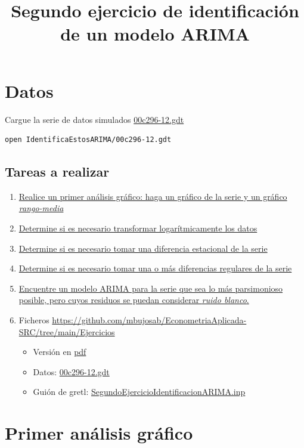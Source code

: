 \documentclass[10pt]{article}
\date{}
\title{Segundo ejercicio de identificación de un modelo ARIMA}
\begin{document}
\maketitle
\section*{Datos}
\label{sec:org64b2946}

Cargue la serie de datos simulados \href{IdentificaEstosARIMA/00c296-12.gdt}{00c296-12.gdt}

\begin{verbatim}
open IdentificaEstosARIMA/00c296-12.gdt
\end{verbatim}
\subsection*{Tareas a realizar}
\label{sec:org500ccd4}
\begin{enumerate}
\item \hyperref[sec:orgab07911]{Realice un primer análisis gráfico: haga
un gráfico de la serie y un gráfico \emph{rango-media}}
\item \hyperref[sec:orgec107d1]{Determine si es necesario transformar logarítmicamente los datos}
\item \hyperref[sec:orgf027ddb]{Determine si es necesario tomar una
diferencia estacional de la serie}
\item \hyperref[sec:orgd966540]{Determine si es necesario tomar una o
más diferencias regulares de la serie}
\item \hyperref[sec:org2c8f3c9]{Encuentre un modelo ARIMA para la
serie que sea lo más parsimonioso posible, pero cuyos residuos se
puedan considerar \emph{ruido blanco}.}

\item Ficheros \url{https://github.com/mbujosab/EconometriaAplicada-SRC/tree/main/Ejercicios}
\begin{itemize}
\item Versión en \href{https://github.com/mbujosab/EconometriaAplicada-SRC/blob/main/Ejercicios/SegundoEjercicioIdentificacionARIMA.pdf}{pdf}
\item Datos:  \href{IdentificaEstosARIMA/00c296-12.gdt}{00c296-12.gdt}
\item Guión de gretl: \url{SegundoEjercicioIdentificacionARIMA.inp}
\end{itemize}
\end{enumerate}
\section*{Primer análisis gráfico}
\label{sec:orgab07911}
\end{document}
